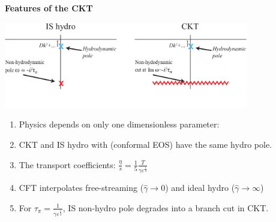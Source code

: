 \documentclass[9pt,a4paper,unknownkeysallowed,xcolor=dvipsnames,aspectratio=43]{beamer}
\begin{document}
\begin{frame}{\bf\huge Features of the CKT}
\begin{center}
\includegraphics[width=0.8\textwidth]{fig/omega_ISCKT0}\end{center}
\begin{enumerate}
\item {Physics depends on only one dimensionless parameter:}\\
\begin{center}
{\color{darkred}
}
\end{center}
\item {CKT and IS hydro with (conformal EOS) have the same hydro pole.}
\item {The transport coefficients:}
$
\frac{\eta}{s} = \frac{1}{5}\frac{T}{\gamma \varepsilon^\frac{1}{4}}
$
\item {CFT interpolates free-streaming ($\hat{\gamma}\to 0$) and ideal hydro ($\hat{\gamma}\to\infty$)}
\item {\color{darkred}For $\tau_\pi = \frac{1}{\gamma \varepsilon^\frac{1}{4}}$, IS non-hydro pole degrades into a branch cut in CKT.}
\end{enumerate}
\end{frame}
%
%
%
\end{document}
